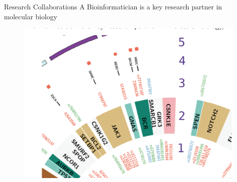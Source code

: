 \documentclass[11pt, aspectratio=43]{beamer}
\begin{document}
	\begin{frame}{Research Collaborations}
		A Bioinformatician is a key research partner in molecular biology
		\begin{figure}[h]
			\centering
			\includegraphics[scale=0.45]{Figures/analyz.png}
		\end{figure}
		
		
	\end{frame}
	
\end{document}
